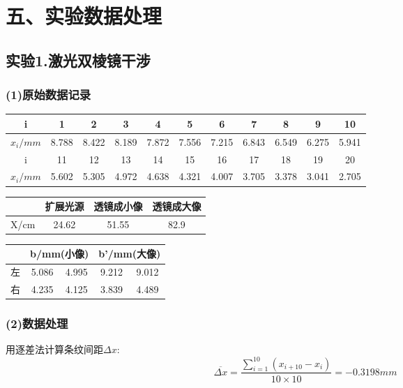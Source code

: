 \documentclass[11pt,a4paper,oneside]{article}
\begin{document}
\section*{五、实验数据处理}
\subsection*{实验1.激光双棱镜干涉}
\subsubsection*{(1)原始数据记录}

\begin{center}
\begin{table}[htbp]
\begin{tabular}{|c|c|c|c|c|c|c|c|c|c|c|}
\hline 
i & 1 & 2 & 3 & 4 & 5 & 6 & 7 & 8 & 9 & 10 
\\ 
\hline 
$x_i/mm$
&8.788&8.422&8.189&7.872&7.556&7.215&6.843&6.549&6.275&5.941
\\ 
\hline 
i & 11 & 12 & 13 & 14 & 15 & 16 & 17 & 18 & 19 & 20 
\\ 
\hline 
$x_i/mm$ 
&5.602&5.305&4.972&4.638&4.321&4.007&3.705&3.378&3.041&2.705
\\ 
\hline 
\end{tabular} 
\end{table}
\begin{table}[htbp]
\begin{tabular}{|c|c|c|c|}
\hline 
   & 扩展光源 & 透镜成小像 & 透镜成大像 \\ 
\hline 
X/cm 
&24.62
&51.55
&82.9

\\
\hline 
\end{tabular} 
\end{table}
\begin{table}[htbp]
\begin{tabular}{|c|c|c|c|c|}
\hline  
 & \multicolumn{2}{|c|}{b/mm(小像) }& \multicolumn{2}{|c|}{b'/mm(大像)} \\ 
\hline 
左 & 5.086 &4.995 & 9.212 & 9.012 \\ 
\hline 
右 & 4.235 &4.125 & 3.839 & 4.489 \\ 
\hline 
\end{tabular}
\end{table}
\end{center}

\subsubsection*{(2)数据处理}
用逐差法计算条纹间距${\Delta}x$:
$$\overline{{\Delta}x} = \displaystyle\frac{\sum\limits_{i=1}^{10}(x_{i+10}-x_i)}{10{\times}10} = -0.3198mm$$
\end{document}
